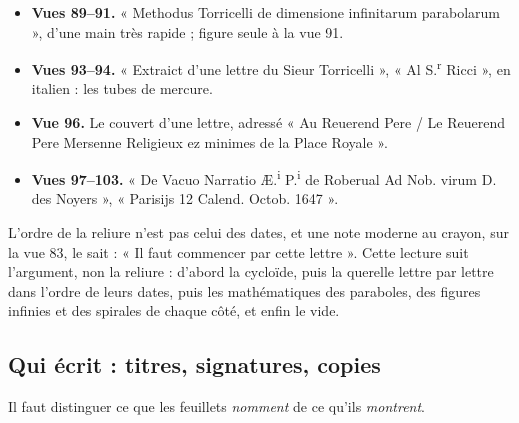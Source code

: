 \documentclass[11pt,a4paper]{article}
\begin{document}
\begin{itemize}
    elle s'arrête au milieu d'une phrase à la vue 88.
  \item \textbf{Vues 89--91.} « Methodus Torricelli de dimensione infinitarum
    parabolarum », d'une main très rapide ; figure seule à la vue 91.
  \item \textbf{Vues 93--94.} « Extraict d'une lettre du Sieur Torricelli »,
    « Al S.\textsuperscript{r} Ricci », en italien : les tubes de mercure.
  \item \textbf{Vue 96.} Le couvert d'une lettre, adressé « Au Reuerend Pere /
    Le Reuerend Pere Mersenne Religieux ez minimes de la Place Royale ».
  \item \textbf{Vues 97--103.} « De Vacuo Narratio Æ.\textsuperscript{i}
    P.\textsuperscript{i} de Roberual Ad Nob. virum D. des Noyers », « Parisijs
    12 Calend. Octob. 1647 ».
\end{itemize}

L'ordre de la reliure n'est pas celui des dates, et une note moderne au crayon,
sur la vue 83, le sait : « Il faut commencer par cette lettre ». Cette lecture
suit l'argument, non la reliure : d'abord la cycloïde, puis la querelle lettre
par lettre dans l'ordre de leurs dates, puis les mathématiques des paraboles,
des figures infinies et des spirales de chaque côté, et enfin le vide.

\subsection*{Qui écrit : titres, signatures, copies}

Il faut distinguer ce que les feuillets \emph{nomment} de ce qu'ils
\emph{montrent}.
\end{document}
